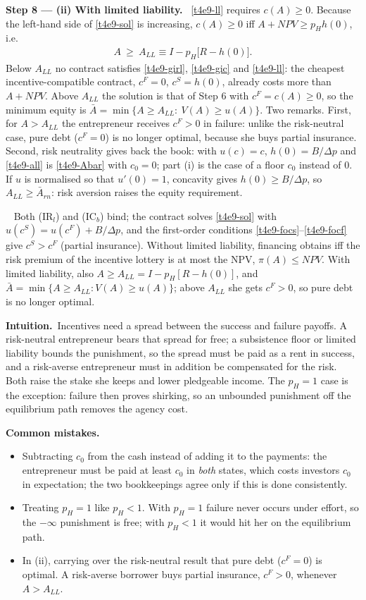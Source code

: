 \documentclass[11pt,a4paper]{article}
\newcommand{\step}[2]{\par\medskip\noindent\textbf{Step #1 --- #2.}~}
\newcommand{\intuition}{\par\medskip\noindent\textbf{Intuition.}~}
\newcommand{\answer}[1]{\par\smallskip\noindent\fbox{\textbf{Answer #1.}}~}
\newcommand{\pitfalls}{\par\medskip\noindent\textbf{Common mistakes.}}
\begin{document}
\step{8}{(ii) With limited liability} \eqref{t4e9-ll} requires $c(A)\ge0$. Because the left-hand side of
\eqref{t4e9-sol} is increasing, $c(A)\ge0$ iff $A+\mathit{NPV}\ge p_Hh(0)$, i.e.
\begin{align}
  A\ \ge\ A_{LL}\equiv I-p_H\big[R-h(0)\big]. \label{t4e9-all}
\end{align}
Below $A_{LL}$ no contract satisfies \eqref{t4e9-girl}, \eqref{t4e9-gic} and \eqref{t4e9-ll}: the cheapest
incentive-compatible contract, $c^F=0$, $c^S=h(0)$, already costs more than $A+\mathit{NPV}$. Above
$A_{LL}$ the solution is that of Step 6 with $c^F=c(A)\ge0$, so the minimum equity is
$\bar A=\min\{A\ge A_{LL}:\ V(A)\ge u(A)\}$. Two remarks. First, for $A>A_{LL}$ the entrepreneur
receives $c^F>0$ in failure: unlike the risk-neutral case, pure debt ($c^F=0$) is no longer optimal,
because she buys partial insurance. Second, risk neutrality gives back the book: with $u(c)=c$,
$h(0)=B/\Delta p$ and \eqref{t4e9-all} is \eqref{t4e9-Abar} with $c_0=0$; part (i) is the case of a floor
$c_0$ instead of $0$. If $u$ is normalised so that $u'(0)=1$, concavity gives $h(0)\ge B/\Delta p$, so
$A_{LL}\ge\bar A_{rn}$: risk aversion raises the equity requirement.

\answer{(ii)} Both (IR$_l$) and (IC$_b$) bind; the contract solves \eqref{t4e9-sol} with
$u(c^S)=u(c^F)+B/\Delta p$, and the first-order conditions \eqref{t4e9-focs}--\eqref{t4e9-focf} give
$c^S>c^F$ (partial insurance). Without limited liability, financing obtains iff the risk premium of
the incentive lottery is at most the NPV, $\pi(A)\le\mathit{NPV}$. With limited liability, also
$A\ge A_{LL}=I-p_H[R-h(0)]$, and $\bar A=\min\{A\ge A_{LL}:V(A)\ge u(A)\}$; above $A_{LL}$ she gets
$c^F>0$, so pure debt is no longer optimal.

\intuition Incentives need a spread between the success and failure payoffs. A risk-neutral
entrepreneur bears that spread for free; a subsistence floor or limited liability bounds the
punishment, so the spread must be paid as a rent in success, and a risk-averse entrepreneur must in
addition be compensated for the risk. Both raise the stake she keeps and lower pledgeable income.
The $p_H=1$ case is the exception: failure then proves shirking, so an unbounded punishment off the
equilibrium path removes the agency cost.

\pitfalls
\begin{itemize}
  \item Subtracting $c_0$ from the cash instead of adding it to the payments: the entrepreneur must be
        paid at least $c_0$ in \emph{both} states, which costs investors $c_0$ in expectation; the two
        bookkeepings agree only if this is done consistently.
  \item Treating $p_H=1$ like $p_H<1$. With $p_H=1$ failure never occurs under effort, so the
        $-\infty$ punishment is free; with $p_H<1$ it would hit her on the equilibrium path.
  \item In (ii), carrying over the risk-neutral result that pure debt ($c^F=0$) is optimal. A
        risk-averse borrower buys partial insurance, $c^F>0$, whenever $A>A_{LL}$.
\end{itemize}
\end{document}
